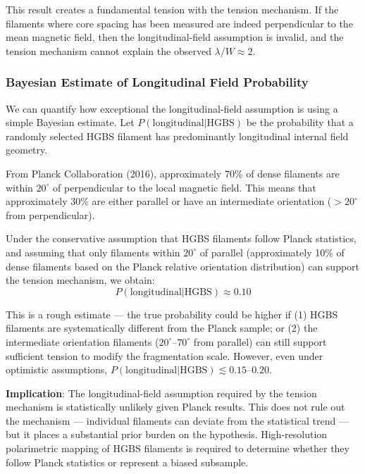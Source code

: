 \documentclass[11pt,a4paper]{article}
\begin{document}
This result creates a fundamental tension with the tension mechanism. If the filaments where core spacing has been measured are indeed perpendicular to the mean magnetic field, then the longitudinal-field assumption is invalid, and the tension mechanism cannot explain the observed $\lambda/W \approx 2$.

\subsubsection{Bayesian Estimate of Longitudinal Field Probability}

We can quantify how exceptional the longitudinal-field assumption is using a simple Bayesian estimate. Let $P(\text{longitudinal}|\text{HGBS})$ be the probability that a randomly selected HGBS filament has predominantly longitudinal internal field geometry.

From Planck Collaboration (2016), approximately 70\% of dense filaments are within $20^\circ$ of perpendicular to the local magnetic field. This means that approximately 30\% are either parallel or have an intermediate orientation ($>20^\circ$ from perpendicular).

Under the conservative assumption that HGBS filaments follow Planck statistics, and assuming that only filaments within $20^\circ$ of parallel (approximately 10\% of dense filaments based on the Planck relative orientation distribution) can support the tension mechanism, we obtain:
\begin{equation}
P(\text{longitudinal}|\text{HGBS}) \approx 0.10
\end{equation}

This is a rough estimate — the true probability could be higher if (1) HGBS filaments are systematically different from the Planck sample; or (2) the intermediate orientation filaments ($20^\circ$--$70^\circ$ from parallel) can still support sufficient tension to modify the fragmentation scale. However, even under optimistic assumptions, $P(\text{longitudinal}|\text{HGBS}) \lesssim 0.15$--$0.20$.

\textbf{Implication}: The longitudinal-field assumption required by the tension mechanism is statistically unlikely given Planck results. This does not rule out the mechanism — individual filaments can deviate from the statistical trend — but it places a substantial prior burden on the hypothesis. High-resolution polarimetric mapping of HGBS filaments is required to determine whether they follow Planck statistics or represent a biased subsample.
\end{document}
